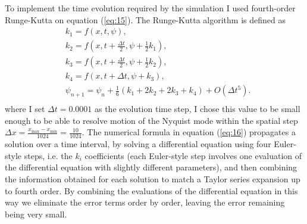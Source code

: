 \documentclass[10pt, a4paper, singlespacing]{report}
\begin{document}
To implement the time evolution required by the simulation I used fourth-order Runge-Kutta on equation (\ref{eq:15}). The Runge-Kutta algorithm is defined as\cite{N_R}
\begin{equation} \label{eq:16}
\begin{split}
&k_1 = f(x, t, \psi),\\
&k_2 = f(x, t + \frac{\Delta t}{2}, \psi + \frac{1}{2}k_1),\\
&k_3 = f(x, t + \frac{\Delta t}{2}, \psi + \frac{1}{2}k_2),\\
&k_4 = f(x, t + \Delta t, \psi + k_3),\\
&\psi_{n + 1} = \psi_{n} + \frac{1}{6}(k_1 + 2k_2 + 2k_3 + k_4) + O(\Delta t^5).\\
\end{split}
\end{equation}
where I set $\Delta t = 0.0001$ as the evolution time step, I chose this value to be small enough to be able to resolve motion of the Nyquist mode within the spatial step 
$\Delta x = \frac{x_{\mathrm{max}} - x_{\mathrm{min}}}{1024} = \frac{10}{1024}$.
The numerical formula in equation (\ref{eq:16}) propagates a solution over a time interval, by solving a differential equation using four Euler-style steps, i.e. the $k_i$ coefficients (each Euler-style step involves one evaluation of the differential equation with slightly different parameters), and then combining the information obtained for each solution to match a Taylor series expansion up to fourth order. By combining the evaluations of the differential equation in this way we eliminate the error terms order by order, leaving the error remaining being very small\cite{N_R}.
\end{document}
